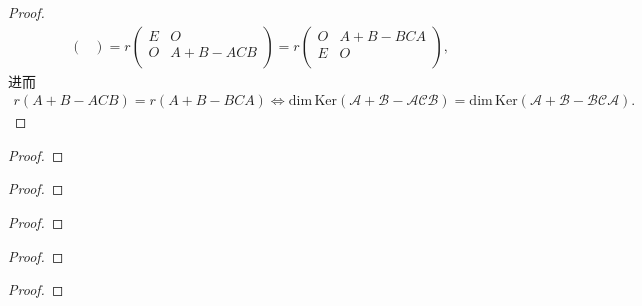 \documentclass[../../main.tex]{subfiles}
\begin{document}
\begin{proof}
\begin{align*}
\begin{pmatrix}
\end{pmatrix} =r\begin{pmatrix}
E&		O\\
O&		A+B-ACB\\
\end{pmatrix} =r\begin{pmatrix}
O&		A+B-BCA\\
E&		O\\
\end{pmatrix},
\end{align*}
进而
\begin{align*}
r( A+B-ACB ) =r( A+B-BCA ) \Longleftrightarrow \mathrm{dim}\,\mathrm{Ker}( \mathscr{A} +\mathscr{B} -\mathscr{A} \mathscr{C} \mathscr{B} ) =\mathrm{dim}\,\mathrm{Ker}( \mathscr{A} +\mathscr{B} -\mathscr{B} \mathscr{C} \mathscr{A} ).
\end{align*}

\end{proof}

\begin{example}

\end{example}
\begin{proof}


\end{proof}

\begin{example}

\end{example}
\begin{proof}


\end{proof}

\begin{example}

\end{example}
\begin{proof}


\end{proof}

\begin{example}

\end{example}
\begin{proof}


\end{proof}

\begin{example}

\end{example}
\begin{proof}


\end{proof}
\end{document}
